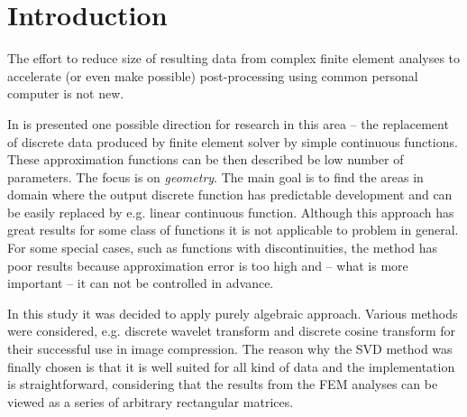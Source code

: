 \section{Introduction}
\label{sec:introduction}


The effort to reduce size of resulting data from complex finite element analyses to accelerate (or even make possible) post-processing using common personal computer is not new.


In \cite{Benes2016} is presented one possible direction for research in this area -- the replacement of discrete data produced by finite element solver by simple continuous functions. These approximation functions can be then described be low number of parameters. The focus is on \textit{geometry}. The main goal is to find the areas in domain where the output discrete function has predictable development and can be easily replaced by e.g. linear continuous function. Although this approach has great results for some class of functions it is not applicable to problem in general. For some special cases, such as functions with discontinuities, the method has poor results because approximation error is too high and -- what is more important -- it can not be controlled in advance.

In this study it was decided to apply purely algebraic approach. Various methods were considered, e.g. discrete wavelet transform \cite{Lui2001} and discrete cosine transform \cite{Watson1994} for their successful use in image compression. The reason why the SVD method was finally chosen is that it is well suited for all kind of data and the implementation is straightforward, considering that the results from the FEM analyses can be viewed as a series of arbitrary rectangular matrices.


